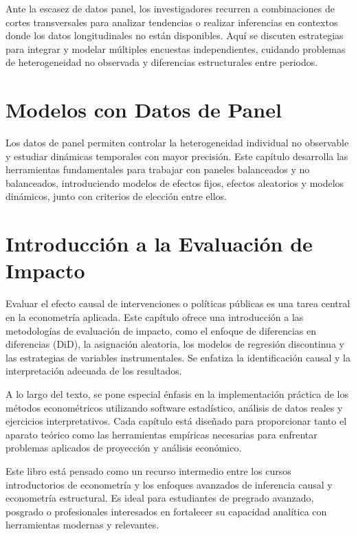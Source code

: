 \documentclass[
  letterpaper,
  DIV=11,
  numbers=noendperiod]{scrreprt}
\begin{document}
Ante la escasez de datos panel, los investigadores recurren a
combinaciones de cortes transversales para analizar tendencias o
realizar inferencias en contextos donde los datos longitudinales no
están disponibles. Aquí se discuten estrategias para integrar y modelar
múltiples encuestas independientes, cuidando problemas de heterogeneidad
no observada y diferencias estructurales entre periodos.

\section{Modelos con Datos de Panel}\label{modelos-con-datos-de-panel}

Los datos de panel permiten controlar la heterogeneidad individual no
observable y estudiar dinámicas temporales con mayor precisión. Este
capítulo desarrolla las herramientas fundamentales para trabajar con
paneles balanceados y no balanceados, introduciendo modelos de efectos
fijos, efectos aleatorios y modelos dinámicos, junto con criterios de
elección entre ellos.

\section{Introducción a la Evaluación de
Impacto}\label{introducciuxf3n-a-la-evaluaciuxf3n-de-impacto}

Evaluar el efecto causal de intervenciones o políticas públicas es una
tarea central en la econometría aplicada. Este capítulo ofrece una
introducción a las metodologías de evaluación de impacto, como el
enfoque de diferencias en diferencias (DiD), la asignación aleatoria,
los modelos de regresión discontinua y las estrategias de variables
instrumentales. Se enfatiza la identificación causal y la interpretación
adecuada de los resultados.

A lo largo del texto, se pone especial énfasis en la implementación
práctica de los métodos econométricos utilizando software estadístico,
análisis de datos reales y ejercicios interpretativos. Cada capítulo
está diseñado para proporcionar tanto el aparato teórico como las
herramientas empíricas necesarias para enfrentar problemas aplicados de
proyección y análisis económico.

Este libro está pensado como un recurso intermedio entre los cursos
introductorios de econometría y los enfoques avanzados de inferencia
causal y econometría estructural. Es ideal para estudiantes de pregrado
avanzado, posgrado o profesionales interesados en fortalecer su
capacidad analítica con herramientas modernas y relevantes.
\end{document}
